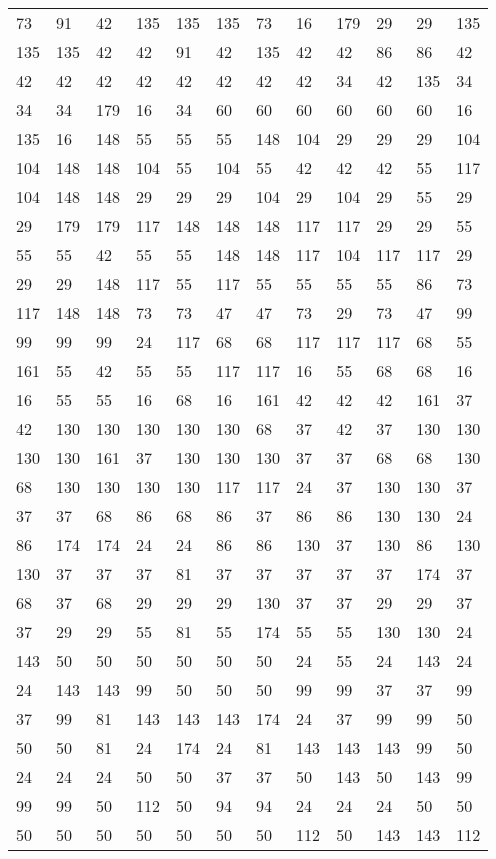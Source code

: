 \begin{longtable}{llllllllllll}
73 &91& 42 &135 &135& 135&73 &16& 179 &29 &29& 135\\
135 &135& 42 &42 &91& 42&135 &42& 42 &86 &86& 42\\
42 &42& 42 &42 &42& 42&42 &42& 34 &42 &135& 34\\
34 &34& 179 &16 &34& 60&60 &60& 60 &60 &60& 16\\
135 &16& 148 &55 &55& 55&148 &104& 29 &29 &29& 104\\
104 &148& 148 &104 &55& 104&55 &42& 42 &42 &55& 117\\
104 &148& 148 &29 &29& 29&104 &29& 104 &29 &55& 29\\
29 &179& 179 &117 &148& 148&148 &117& 117 &29 &29& 55\\
55 &55& 42 &55 &55& 148&148 &117& 104 &117 &117& 29\\
29 &29& 148 &117 &55& 117&55 &55& 55 &55 &86& 73\\
117 &148& 148 &73 &73& 47&47 &73& 29 &73 &47& 99\\
99 &99& 99 &24 &117& 68&68 &117& 117 &117 &68& 55\\
161 &55& 42 &55 &55& 117&117 &16& 55 &68 &68& 16\\
16 &55& 55 &16 &68& 16&161 &42& 42 &42 &161& 37\\
42 &130& 130 &130 &130& 130&68 &37& 42 &37 &130& 130\\
130 &130& 161 &37 &130& 130&130 &37& 37 &68 &68& 130\\
68 &130& 130 &130 &130& 117&117 &24& 37 &130 &130& 37\\
37 &37& 68 &86 &68& 86&37 &86& 86 &130 &130& 24\\
86 &174& 174 &24 &24& 86&86 &130& 37 &130 &86& 130\\
130 &37& 37 &37 &81& 37&37 &37& 37 &37 &174& 37\\
68 &37& 68 &29 &29& 29&130 &37& 37 &29 &29& 37\\
37 &29& 29 &55 &81& 55&174 &55& 55 &130 &130& 24\\
143 &50& 50 &50 &50& 50&50 &24& 55 &24 &143& 24\\
24 &143& 143 &99 &50& 50&50 &99& 99 &37 &37& 99\\
37 &99& 81 &143 &143& 143&174 &24& 37 &99 &99& 50\\
50 &50& 81 &24 &174& 24&81 &143& 143 &143 &99& 50\\
24 &24& 24 &50 &50& 37&37 &50& 143 &50 &143& 99\\
99 &99& 50 &112 &50& 94&94 &24& 24 &24 &50& 50\\
50 &50& 50 &50 &50& 50&50 &112& 50 &143 &143& 112\\

\end{longtable}
